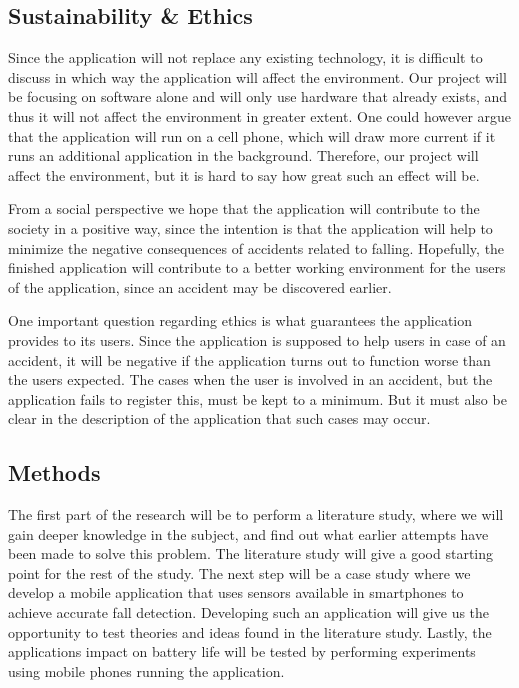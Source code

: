 \documentclass[12pt, a4paper, onecolumn]{article}
\begin{document}
	\subsection{Sustainability \& Ethics}
	
	Since the application will not replace any existing technology, it is difficult to discuss in which way the application will affect the environment. Our project will be focusing on software alone and will only use hardware that already exists, and thus it will not affect the environment in greater extent. One could however argue that the application will run on a cell phone, which will draw more current if it runs an additional application in the background. Therefore, our project will affect the environment, but it is hard to say how great such an effect will be.
	
	From a social perspective we hope that the application will contribute to the society in a positive way, since the intention is that the application will help to minimize the negative consequences of accidents related to falling. Hopefully, the finished application will contribute to a better working environment for the users of the application, since an accident may be discovered earlier.  
	
	One important question regarding ethics is what guarantees the application provides to its users. Since the application is supposed to help users in case of an accident, it will be negative if the application turns out to function worse than the users expected. The cases when the user is involved in an accident, but the application fails to register this, must be kept to a minimum. But it must also be clear in the description of the application that such cases may occur.
	
	\subsection{Methods}
	
	The first part of the research will be to perform a literature study, where we will gain deeper knowledge in the subject, and find out what earlier attempts have been made to solve this problem. The literature study will give a good starting point for the rest of the study. The next step will be a case study where we develop a mobile application that uses sensors available in smartphones to achieve accurate fall detection. Developing such an application will give us the opportunity to test theories and ideas found in the literature study. Lastly, the applications impact on battery life will be tested by performing experiments using mobile phones running the application.
	
\end{document}
